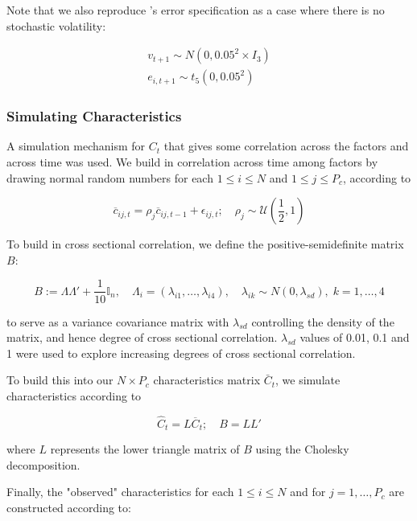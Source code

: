 \documentclass[11pt, a4paper, table]{article}
\begin{document}
Note that we also reproduce \cite{gu_empirical_2018}'s error specification as a case where there is no stochastic volatility:

\begin{align}
	v_{t+1} \sim N(0, 0.05^2 \times I_3) \\
	e_{i, t+1} \sim t_5(0, 0.05^2)
\end{align}

\subsubsection{Simulating Characteristics}

A simulation mechanism for $C_t$ that gives some correlation across the factors and across time was used. We build in correlation across time among factors by drawing normal random numbers for each $1\leq i\leq N$ and $1\leq j\leq P_{c}$, according to 

\begin{equation}
	\overline{c}_{i j, t} = \rho_{j} \overline{c}_{i j, t-1}+\epsilon_{i j, t} ;
	\quad \rho_{j} \sim \mathcal{U} \left( \frac{1}{2},1 \right) 
\end{equation}

To build in cross sectional correlation, we define the positive-semidefinite matrix $B$:

\begin{equation}
	B:=\Lambda\Lambda' + \frac{1}{10}\mathbb{I}_{n}, \quad
	\Lambda_i = (\lambda_{i1},\dots,\lambda_{i4}), \quad
	\lambda_{ik}\sim N(0, \lambda_{sd}), \; k=1, \dots, 4
\end{equation}

to serve as a variance covariance matrix with $\lambda_{sd}$ controlling the density of the matrix, and hence degree of cross sectional correlation. $\lambda_{sd}$ values of 0.01, 0.1 and 1 were used to explore increasing degrees of cross sectional correlation.

To build this into our $N\times P_{c}$ characteristics matrix $\bar{C}_t$, we simulate characteristics according to
 
\begin{equation}
	\widehat{C}_{t}=L\overline{C}_{t} ; \quad B = LL' 
\end{equation}

where $L$ represents the lower triangle matrix of $B$ using the Cholesky decomposition.
 
Finally, the "observed" characteristics for each $1\leq i\leq N$ and for $j=1, \dots, P_{c}$ are constructed according to:
\end{document}
